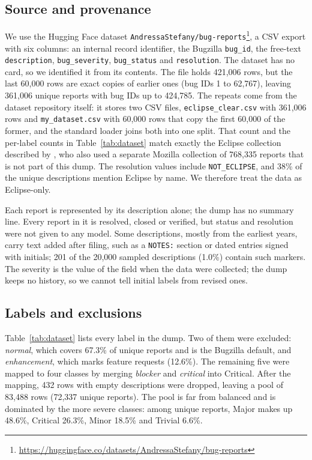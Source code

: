 \documentclass[a4paper,fleqn]{cas-sc}
\begin{document}
\subsection{Source and provenance}

We use the Hugging Face dataset \texttt{AndressaStefany/bug-reports}\footnote{\url{https://huggingface.co/datasets/AndressaStefany/bug-reports}}, a CSV export with six columns: an internal record identifier, the Bugzilla
\texttt{bug\_id}, the free-text \texttt{description}, \texttt{bug\_severity},
\texttt{bug\_status} and \texttt{resolution}. The dataset has no card, so we identified
it from its contents. The file holds 421,006 rows, but the last 60,000 rows are exact copies of
earlier ones (bug IDs 1 to 62,767), leaving 361,006 unique reports with bug IDs up to
424,785. The repeats come from the dataset repository itself: it stores two CSV files,
\texttt{eclipse\_clear.csv} with 361,006 rows and \texttt{my\_dataset.csv} with 60,000
rows that copy the first 60,000 of the former, and the standard loader joins both into
one split. That count and the per-label counts in Table~\ref{tab:dataset} match exactly
the Eclipse collection described by \citet{oliveira2024predictive}, who also used a
separate Mozilla collection of 768,335 reports that is not part of this dump. The
resolution values include \texttt{NOT\_ECLIPSE}, and 38\% of the unique descriptions
mention Eclipse by name. We therefore treat the data as Eclipse-only.

Each report is represented by its description alone; the dump has no summary line.
Every report in it is resolved, closed or verified, but status and resolution were not
given to any model. Some descriptions, mostly from the earliest years, carry text added
after filing, such as a \texttt{NOTES:} section or dated entries signed with initials;
201 of the 20,000 sampled descriptions (1.0\%) contain such markers. The severity is the value of the
field when the data were collected; the dump keeps no history, so we cannot tell
initial labels from revised ones.

\subsection{Labels and exclusions}

Table~\ref{tab:dataset} lists every label in the dump. Two of them were excluded:
\textit{normal}, which covers 67.3\% of unique reports and is the Bugzilla default, and
\textit{enhancement}, which marks feature requests (12.6\%). The remaining five were
mapped to four classes by merging \textit{blocker} and \textit{critical} into Critical.
After the mapping, 432 rows with empty descriptions were dropped, leaving a pool of
83,488 rows (72,337 unique reports). The pool is far from balanced and is dominated by
the more severe classes: among unique reports, Major makes up 48.6\%, Critical 26.3\%,
Minor 18.5\% and Trivial 6.6\%.
\end{document}
